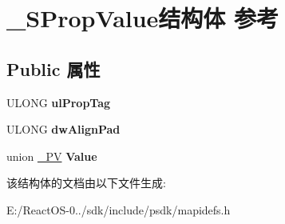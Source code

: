 \hypertarget{struct___s_prop_value}{}\section{\+\_\+\+S\+Prop\+Value结构体 参考}
\label{struct___s_prop_value}
\subsection*{Public 属性}
\begin{DoxyCompactItemize}
\item 
\mbox{\label{struct___s_prop_value_a3f401aa98d8d3011c6c7ba8c3cf13a75}} 
U\+L\+O\+NG {\bfseries ul\+Prop\+Tag}
\item 
\mbox{\label{struct___s_prop_value_ac3eb96d28841a9e9f707bf7c10ab639a}} 
U\+L\+O\+NG {\bfseries dw\+Align\+Pad}
\item 
\mbox{\label{struct___s_prop_value_af6625834cd620be683f3ea2062619be7}} 
union \hyperlink{union___p_v}{\+\_\+\+PV} {\bfseries Value}
\end{DoxyCompactItemize}


该结构体的文档由以下文件生成\+:\begin{DoxyCompactItemize}
\item 
E\+:/\+React\+O\+S-\/0../sdk/include/psdk/mapidefs.\+h\end{DoxyCompactItemize}
